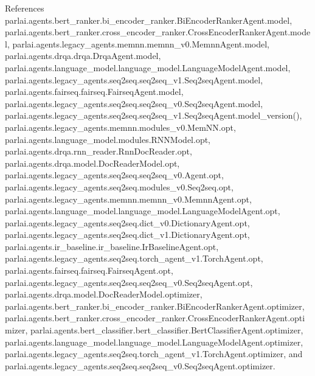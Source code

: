References parlai.\+agents.\+bert\+\_\+ranker.\+bi\+\_\+encoder\+\_\+ranker.\+Bi\+Encoder\+Ranker\+Agent.\+model, parlai.\+agents.\+bert\+\_\+ranker.\+cross\+\_\+encoder\+\_\+ranker.\+Cross\+Encoder\+Ranker\+Agent.\+model, parlai.\+agents.\+legacy\+\_\+agents.\+memnn.\+memnn\+\_\+v0.\+Memnn\+Agent.\+model, parlai.\+agents.\+drqa.\+drqa.\+Drqa\+Agent.\+model, parlai.\+agents.\+language\+\_\+model.\+language\+\_\+model.\+Language\+Model\+Agent.\+model, parlai.\+agents.\+legacy\+\_\+agents.\+seq2seq.\+seq2seq\+\_\+v1.\+Seq2seq\+Agent.\+model, parlai.\+agents.\+fairseq.\+fairseq.\+Fairseq\+Agent.\+model, parlai.\+agents.\+legacy\+\_\+agents.\+seq2seq.\+seq2seq\+\_\+v0.\+Seq2seq\+Agent.\+model, parlai.\+agents.\+legacy\+\_\+agents.\+seq2seq.\+seq2seq\+\_\+v1.\+Seq2seq\+Agent.\+model\+\_\+version(), parlai.\+agents.\+legacy\+\_\+agents.\+memnn.\+modules\+\_\+v0.\+Mem\+N\+N.\+opt, parlai.\+agents.\+language\+\_\+model.\+modules.\+R\+N\+N\+Model.\+opt, parlai.\+agents.\+drqa.\+rnn\+\_\+reader.\+Rnn\+Doc\+Reader.\+opt, parlai.\+agents.\+drqa.\+model.\+Doc\+Reader\+Model.\+opt, parlai.\+agents.\+legacy\+\_\+agents.\+seq2seq.\+seq2seq\+\_\+v0.\+Agent.\+opt, parlai.\+agents.\+legacy\+\_\+agents.\+seq2seq.\+modules\+\_\+v0.\+Seq2seq.\+opt, parlai.\+agents.\+legacy\+\_\+agents.\+memnn.\+memnn\+\_\+v0.\+Memnn\+Agent.\+opt, parlai.\+agents.\+language\+\_\+model.\+language\+\_\+model.\+Language\+Model\+Agent.\+opt, parlai.\+agents.\+legacy\+\_\+agents.\+seq2seq.\+dict\+\_\+v0.\+Dictionary\+Agent.\+opt, parlai.\+agents.\+legacy\+\_\+agents.\+seq2seq.\+dict\+\_\+v1.\+Dictionary\+Agent.\+opt, parlai.\+agents.\+ir\+\_\+baseline.\+ir\+\_\+baseline.\+Ir\+Baseline\+Agent.\+opt, parlai.\+agents.\+legacy\+\_\+agents.\+seq2seq.\+torch\+\_\+agent\+\_\+v1.\+Torch\+Agent.\+opt, parlai.\+agents.\+fairseq.\+fairseq.\+Fairseq\+Agent.\+opt, parlai.\+agents.\+legacy\+\_\+agents.\+seq2seq.\+seq2seq\+\_\+v0.\+Seq2seq\+Agent.\+opt, parlai.\+agents.\+drqa.\+model.\+Doc\+Reader\+Model.\+optimizer, parlai.\+agents.\+bert\+\_\+ranker.\+bi\+\_\+encoder\+\_\+ranker.\+Bi\+Encoder\+Ranker\+Agent.\+optimizer, parlai.\+agents.\+bert\+\_\+ranker.\+cross\+\_\+encoder\+\_\+ranker.\+Cross\+Encoder\+Ranker\+Agent.\+optimizer, parlai.\+agents.\+bert\+\_\+classifier.\+bert\+\_\+classifier.\+Bert\+Classifier\+Agent.\+optimizer, parlai.\+agents.\+language\+\_\+model.\+language\+\_\+model.\+Language\+Model\+Agent.\+optimizer, parlai.\+agents.\+legacy\+\_\+agents.\+seq2seq.\+torch\+\_\+agent\+\_\+v1.\+Torch\+Agent.\+optimizer, and parlai.\+agents.\+legacy\+\_\+agents.\+seq2seq.\+seq2seq\+\_\+v0.\+Seq2seq\+Agent.\+optimizer.



